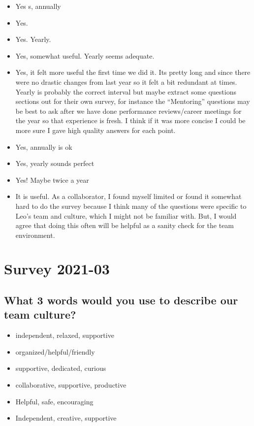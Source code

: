 \documentclass[
]{book}
\providecommand{\tightlist}{%
  \setlength{\itemsep}{0pt}\setlength{\parskip}{0pt}}
\begin{document}
\begin{itemize}
\tightlist
\item
  Yes s, annually
\item
  Yes.
\item
  Yes. Yearly.
\item
  Yes, somewhat useful. Yearly seems adequate.
\item
  Yes, it felt more useful the first time we did it. Its pretty long and since there were no drastic changes from last year so it felt a bit redundant at times. Yearly is probably the correct interval but maybe extract some questions sections out for their own survey, for instance the ``Mentoring'' questions may be best to ask after we have done performance reviews/career meetings for the year so that experience is fresh. I think if it was more concise I could be more sure I gave high quality answers for each point.
\item
  Yes, annually is ok
\item
  Yes, yearly sounds perfect
\item
  Yes! Maybe twice a year
\item
  It is useful. As a collaborator, I found myself limited or found it somewhat hard to do the survey because I think many of the questions were specific to Leo's team and culture, which I might not be familiar with. But, I would agree that doing this often will be helpful as a sanity check for the team environment.
\end{itemize}

\hypertarget{survey-2021-03}{%
\chapter{Survey 2021-03}\label{survey-2021-03}}

\hypertarget{what-3-words-would-you-use-to-describe-our-team-culture-1}{%
\section{What 3 words would you use to describe our team culture?}\label{what-3-words-would-you-use-to-describe-our-team-culture-1}}

\begin{itemize}
\tightlist
\item
  independent, relaxed, supportive
\item
  organized/helpful/friendly
\item
  supportive, dedicated, curious
\item
  collaborative, supportive, productive
\item
  Helpful, safe, encouraging
\item
  Independent, creative, supportive
\end{itemize}
\end{document}
